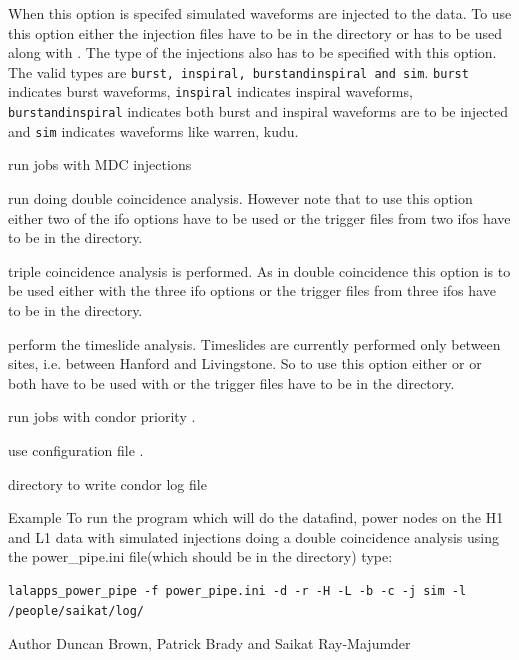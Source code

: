 \begin{entry}
\begin{entry}
\item[\option{--injections} \parm{type}] When this option is specifed 
simulated waveforms are injected to the data.  To use this option either
the injection files have to be in the directory or has to be used along with
.  The type of the injections also has to be specified 
with this option. The valid types are \texttt{burst, inspiral, burstandinspiral
and sim}.  \texttt{burst} indicates burst waveforms, \texttt{inspiral} 
indicates inspiral waveforms, \texttt{burstandinspiral} indicates both
burst and inspiral waveforms are to be injected and \texttt{sim} indicates
waveforms like warren,  kudu.

\item[\option{--mdcinjections}] run jobs with MDC injections      

\item[\option{--coincidence}] run  doing double 
coincidence analysis.  However note that to use this option either
two of the ifo options have to be used or the trigger files from two ifos 
have to be in the directory.

\item[\option{--triplecoincidence}] triple coincidence analysis is performed.  
As in double coincidence this option is to be used
either with the three ifo options or the trigger files from three ifos have
to be in the directory.

\item[\option{--timeslides}] perform the timeslide analysis. Timeslides
are currently performed only between sites, i.e. between Hanford and 
Livingstone. So to use this option either  or 
 or both have to be used with  or the 
trigger files have to be in the directory. 

\item[\option{--priority} \parm{prio}] run jobs with condor priority
.

\item[\option{--config-file} \parm{file}] use configuration file
.

\item[\option{--log-path} \parm{path}] directory to write condor log file

\end{entry}


\item[Example]
To run the program which will do the datafind,  power nodes on the H1
and L1 data with simulated injections doing a double coincidence analysis
using the power\_pipe.ini file(which should be in the directory) type:
\begin{verbatim}
lalapps_power_pipe -f power_pipe.ini -d -r -H -L -b -c -j sim -l /people/saikat/log/
\end{verbatim}

\item[Author]
Duncan Brown, Patrick Brady and Saikat Ray-Majumder
\end{entry}
\clearpage


